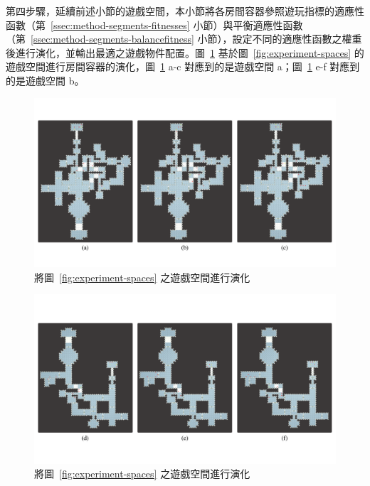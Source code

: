 第四步驟，延續前述小節的遊戲空間，本小節將各房間容器參照遊玩指標的適應性函數（第~\ref{ssec:method-segments-fitnesses} 小節）與平衡適應性函數（第~\ref{ssec:method-segments-balancefitness} 小節），設定不同的適應性函數之權重後進行演化，並輸出最適之遊戲物件配置。圖~\ref{fig:experiment-volumes-evolution} 基於圖~\ref{fig:experiment-spaces} 的遊戲空間進行房間容器的演化，圖~\ref{fig:experiment-volumes-evolution} a-c 對應到的是遊戲空間 a；圖~\ref{fig:experiment-volumes-evolution} e-f 對應到的是遊戲空間 b。

\begin{landscape}
  \begin{figure}[H]
    \begin{center}
      \includegraphics[width=1.05\linewidth]{figures/experiments/experiment-evolution-722780748.pdf}
      \caption{將圖~\protect\ref{fig:experiment-spaces} 之遊戲空間進行演化}
      \label{fig:experiment-volumes-evolution}
    \end{center}
  \end{figure}
\end{landscape}

\begin{landscape}
  \begin{figure}[H]
    \begin{center}
      \includegraphics[width=1.05\linewidth]{figures/experiments/experiment-evolution-1502202776.pdf}
      \caption{將圖~\protect\ref{fig:experiment-spaces} 之遊戲空間進行演化}
    \end{center}
  \end{figure}
\end{landscape}

